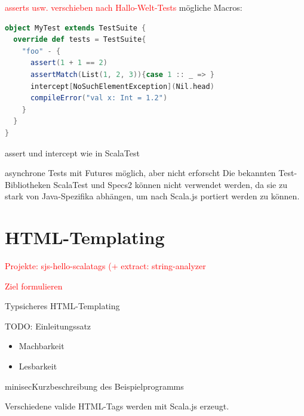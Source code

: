 \documentclass[a4paper, 12pt, hidelinks, listof=totoc, listoftables=totoc, bibliography=totoc]{scrreprt}
\newcommand{\TODO}[1]{\textcolor{red}{#1}\newline}
\begin{document}
\TODO{asserts usw. verschieben nach Hallo-Welt-Tests}
mögliche Macros:
\begin{lstlisting}[language=Scala]
object MyTest extends TestSuite {
  override def tests = TestSuite{
    "foo" - {
      assert(1 + 1 == 2)
      assertMatch(List(1, 2, 3)){case 1 :: _ => }
      intercept[NoSuchElementException](Nil.head)
      compileError("val x: Int = 1.2")
    }
  }
}
\end{lstlisting}

assert und intercept wie in ScalaTest

asynchrone Tests mit Futures möglich, aber nicht erforscht
Die bekannten Test-Bibliotheken ScalaTest und Specs2 können nicht verwendet werden, da sie zu stark von Java-Spezifika abhängen, um nach Scala.js portiert werden zu können\cite[\#OtherTestingLibraries]{haoyi.HOS}.






\section{HTML-Templating}


\TODO{Projekte: sjs-hello-scalatags (+ extract: string-analyzer}


\TODO{Ziel formulieren}

Typsicheres \ac{HTML}-Templating 

TODO: Einleitungssatz


\begin{itemize}
	\item Machbarkeit
	\item Lesbarkeit
\end{itemize}

minisec{Kurzbeschreibung des Beispielprogramms}

Verschiedene valide \ac{HTML}-Tags werden mit Scala.js erzeugt.
\end{document}
